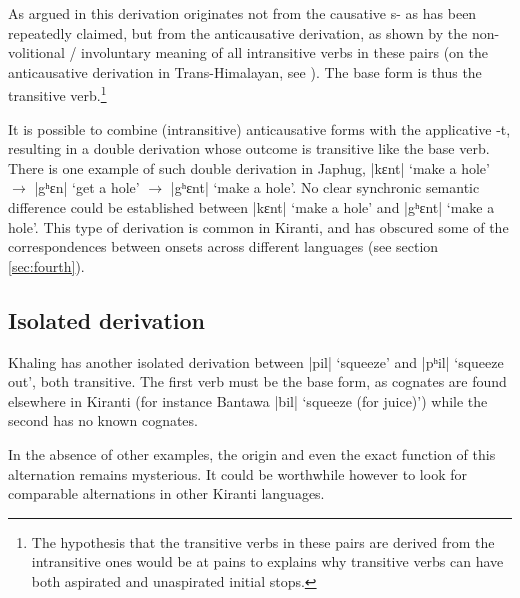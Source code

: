 \documentclass[oneside,a4paper,11pt]{article}
\newcommand{\ipa}[1]{{\phon\mbox{#1}}} %
\newcommand{\dhatu}[2]{|\ipa{#1}| `#2'}
\begin{document}
As argued in \citet{jacques15derivational.khaling} this derivation originates not from the causative \ipa{s-} as has been repeatedly claimed, but from the anticausative derivation, as shown by the non-volitional / involuntary meaning of all intransitive verbs in these pairs (on the anticausative derivation in Trans-Himalayan, see  \citealt{jacques15spontaneous, jacques15causative, hill14voicing}). The base form is thus the transitive verb.\footnote{The hypothesis that the transitive verbs in these pairs are derived from the intransitive ones would be at pains to explains why transitive verbs can have both aspirated and unaspirated initial stops.}

It is possible to combine (intransitive) anticausative forms with the applicative \ipa{-t}, resulting in a double derivation whose outcome is transitive like the base verb. There is one example of such double derivation in Japhug, \dhatu{kɛnt}{make a hole} $\rightarrow$  \dhatu{gʰɛn}{get a hole} $\rightarrow$  \dhatu{gʰɛnt}{make a hole}. No clear synchronic semantic difference could be established between \dhatu{kɛnt}{make a hole} and \dhatu{gʰɛnt}{make a hole}. This type of derivation is common in Kiranti, and has obscured some of the correspondences between onsets across different languages (see section \ref{sec:fourth}).

\subsection{Isolated derivation} \label{sec:isolated}
Khaling has another isolated derivation between \dhatu{pil}{squeeze} and  \dhatu{pʰil}{squeeze out}, both transitive. The first verb must be the base form, as cognates are found elsewhere in Kiranti (for instance Bantawa \dhatu{bil}{squeeze (for juice)}) while the second has no known cognates. 



In the absence of other examples, the origin and even the exact function of this alternation remains mysterious. It could be worthwhile however to look for comparable alternations in other Kiranti languages.
\end{document}
